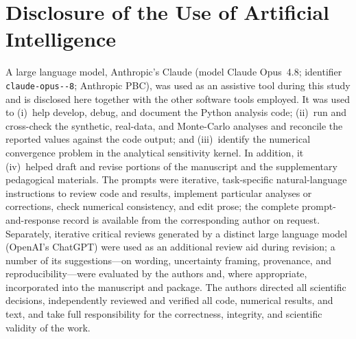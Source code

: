 \documentclass[11pt]{article}
\begin{document}
\section*{Disclosure of the Use of Artificial Intelligence}
A large language model, Anthropic's Claude (model Claude Opus~4.8; identifier \texttt{claude-\allowbreak opus--8}; Anthropic PBC), was used as an assistive tool during this study and is disclosed here together with the other software tools employed. It was used to (i)~help develop, debug, and document the Python analysis code; (ii)~run and cross-check the synthetic, real-data, and Monte-Carlo analyses and reconcile the reported values against the code output; and (iii)~identify the numerical convergence problem in the analytical sensitivity kernel. In addition, it (iv)~helped draft and revise portions of the manuscript and the supplementary pedagogical materials. The prompts were iterative, task-specific natural-language instructions to review code and results, implement particular analyses or corrections, check numerical consistency, and edit prose; the complete prompt-and-response record is available from the corresponding author on request. Separately, iterative critical reviews generated by a distinct large language model (OpenAI's ChatGPT) were used as an additional review aid during revision; a number of its suggestions---on wording, uncertainty framing, provenance, and reproducibility---were evaluated by the authors and, where appropriate, incorporated into the manuscript and package. The authors directed all scientific decisions, independently reviewed and verified all code, numerical results, and text, and take full responsibility for the correctness, integrity, and scientific validity of the work.
\end{document}
